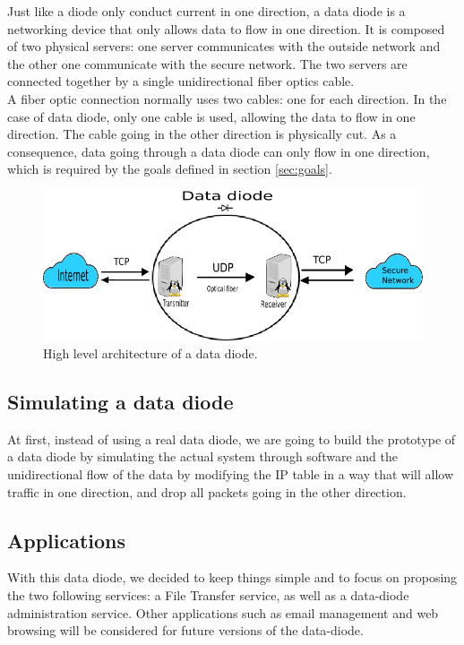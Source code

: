 \documentclass[a4paper,11pt]{article}
\begin{document}
Just like a diode only conduct current in one direction, a data diode is a networking device that only allows data to flow in one direction. It is composed of two physical servers: one server communicates with the outside network and the other one communicate with the secure network. The two servers are connected together by a single unidirectional fiber optics cable.\\

A fiber optic connection normally uses two cables: one for each direction. In the case of 	 data diode, only one cable is used, allowing the data to flow in one direction. The cable going in the other direction is physically cut. As a consequence, data going through a data diode can only flow in one direction, which is required by the goals defined in section \ref{sec:goals}.

\begin{figure}
	\includegraphics[scale=0.7]{img/network.png}
	\caption{High level architecture of a data diode.}
\end{figure}

\subsection{Simulating a data diode}
At first, instead of using a real data diode, we are going to build the prototype of a data diode by simulating the actual system through software and the unidirectional flow of the data by modifying the IP table in a way that will allow traffic in one direction, and drop all packets going in the other direction.

\subsection{Applications}
With this data diode, we decided to keep things simple and to focus on proposing the two following services: a File Transfer service, as well as a data-diode administration service. 
Other applications such as email management and web browsing will be considered for future versions of the data-diode.
\end{document}
